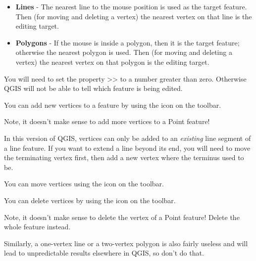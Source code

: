 \begin{itemize}
\item \textbf{Lines}    - The nearest line to the mouse position
                          is used as the target feature.
                          Then (for moving and deleting a vertex)
                          the nearest vertex
                          on that line is the editing target.

\item \textbf{Polygons} - If the mouse is inside a polygon, then it is
                          the target feature; otherwise the nearest polygon
                          is used.
                          Then (for moving and deleting a vertex)
                          the nearest vertex
                          on that polygon is the editing target.
\end{itemize}

You will need to set the property
>>
to a number greater than zero.  Otherwise QGIS will not be able to tell which feature is being edited.



You can add new vertices to a feature by using the
 icon
on the toolbar.

Note, it doesn't make sense to add more vertices to a Point feature!

In this version of QGIS, vertices can only be added to an \textit{existing} line
segment of a line feature.  If you want to extend a line beyond its end,
you will need to move the terminating vertex first, then add a new vertex where
the terminus used to be.


You can move vertices using the  icon
on the toolbar.


You can delete vertices by using the  icon
on the toolbar.

Note, it doesn't make sense to delete the vertex of a Point feature!
Delete the whole feature instead.

Similarly, a one-vertex line or a two-vertex polygon is also
fairly useless and will lead to unpredictable results elsewhere
in QGIS, so don't do that.

